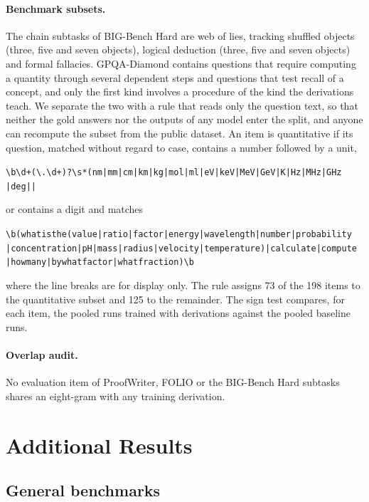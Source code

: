 \paragraph{Benchmark subsets.} The chain subtasks of BIG-Bench Hard are web
of lies, tracking shuffled objects (three, five and seven objects), logical
deduction (three, five and seven objects) and formal fallacies. GPQA-Diamond
contains questions that require computing a quantity through several
dependent steps and questions that test recall of a concept, and only the
first kind involves a procedure of the kind the derivations teach. We
separate the two with a rule that reads only the question text, so that
neither the gold answers nor the outputs of any model enter the split, and
anyone can recompute the subset from the public dataset. An item is
quantitative if its question, matched without regard to case, contains a
number followed by a unit,
\begin{alltt}\footnotesize
\textbackslash{}b\textbackslash{}d+(\textbackslash{}.\textbackslash{}d+)?\textbackslash{}s*(nm|mm|cm|km|kg|mol|ml|eV|keV|MeV|GeV|K|Hz|MHz|GHz
    |deg|\textdegree|%
\end{alltt}
or contains a digit and matches
\begin{alltt}\footnotesize
\textbackslash{}b(what is the (value|ratio|factor|energy|wavelength|number|probability
    |concentration|pH|mass|radius|velocity|temperature)|calculate|compute
    |how many|by what factor|what fraction)\textbackslash{}b
\end{alltt}
where the line breaks are for display only. The rule assigns 73 of the 198
items to the quantitative subset and 125 to the remainder. The sign test
compares, for each item, the pooled runs trained with derivations against
the pooled baseline runs.

\paragraph{Overlap audit.} No evaluation item of ProofWriter, FOLIO or the
BIG-Bench Hard subtasks shares an eight-gram with any training derivation.

\section{Additional Results}
\subsection{General benchmarks}
\label{sec:general-table}

